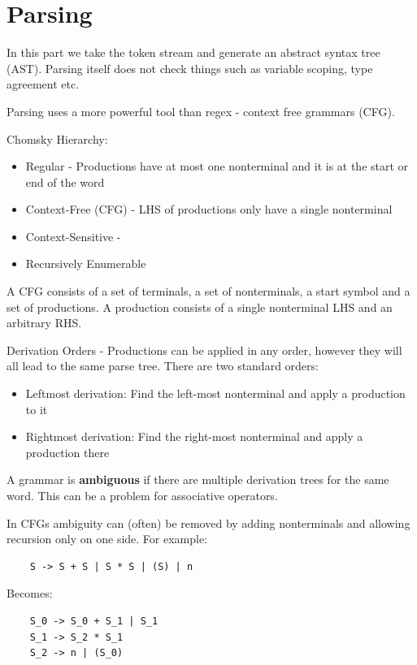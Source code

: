 \section*{Parsing}

In this part we take the token stream and generate an abstract syntax tree (AST). Parsing itself does not check things such as variable scoping, type agreement etc. \medskip

Parsing uses a more powerful tool than regex - context free grammars (CFG). \medskip

Chomsky Hierarchy: 
\begin{itemize}
	\item Regular - Productions have at most one nonterminal and it is at the start or end of the word
	\item Context-Free (CFG) - LHS of productions only have a single nonterminal
	\item Context-Sensitive - 
	\item Recursively Enumerable
\end{itemize}
	
A CFG consists of a set of terminals, a set of nonterminals, a start symbol and a set of productions. A production consists of a single nonterminal LHS and an arbitrary RHS. \medskip

Derivation Orders - Productions can be applied in any order, however they will all lead to the same parse tree. There are two standard orders:
\begin{itemize}
	\item Leftmost derivation: Find the left-most nonterminal and apply a production to it
	\item Rightmost derivation: Find the right-most nonterminal and apply a production there
\end{itemize}

A grammar is \textbf{ambiguous} if there are multiple derivation trees for the same word. This can be a problem for associative operators. \medskip
	
In CFGs ambiguity can (often) be removed by adding nonterminals and allowing recursion only on one side. For example:\smallskip

\begin{lstlisting}
	S -> S + S | S * S | (S) | n
\end{lstlisting} \smallskip

Becomes:\smallskip

\begin{lstlisting}
	S_0 -> S_0 + S_1 | S_1
	S_1 -> S_2 * S_1
	S_2 -> n | (S_0)
\end{lstlisting}


